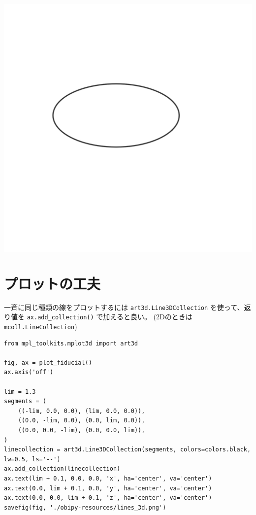 \documentclass[a4paper, 10pt, notitlepage, twocolumn, uplatex, oneside, dvipdfmx]{jsarticle}
\begin{document}
\label{}
\begin{center}
\includegraphics[width=1.0\linewidth]{./obipy-resources/noaxis_3d.png}
\end{center}
\section{プロットの工夫}
\label{sec:org53849b9}
一斉に同じ種類の線をプロットするには \texttt{art3d.Line3DCollection} を使って、返り値を \texttt{ax.add\_collection()} で加えると良い。
(2Dのときは \texttt{mcoll.LineCollection})
\begin{verbatim}
from mpl_toolkits.mplot3d import art3d

fig, ax = plot_fiducial()
ax.axis('off')

lim = 1.3
segments = (
    ((-lim, 0.0, 0.0), (lim, 0.0, 0.0)),
    ((0.0, -lim, 0.0), (0.0, lim, 0.0)),
    ((0.0, 0.0, -lim), (0.0, 0.0, lim)),
)
linecollection = art3d.Line3DCollection(segments, colors=colors.black, lw=0.5, ls='--')
ax.add_collection(linecollection)
ax.text(lim + 0.1, 0.0, 0.0, 'x', ha='center', va='center')
ax.text(0.0, lim + 0.1, 0.0, 'y', ha='center', va='center')
ax.text(0.0, 0.0, lim + 0.1, 'z', ha='center', va='center')
savefig(fig, './obipy-resources/lines_3d.png')
\end{verbatim}
\end{document}
